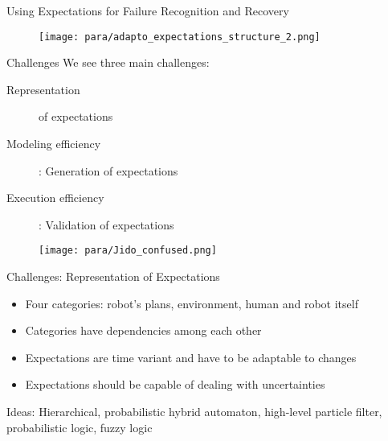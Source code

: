\documentclass{beamer}
\begin{document}
\begin{frame}{Using Expectations for Failure Recognition and Recovery}
 \begin{figure}[h]
    \texttt{[image: para/adapto\_expectations\_structure\_2.png]} 
  \end{figure}
\end{frame}

\begin{frame}{Challenges}
We see three main challenges:
 \begin{description}
\item [Representation] of expectations
\item [Modeling efficiency]: Generation of expectations
\item [Execution efficiency]: Validation of expectations
\end{description} 
 \begin{figure}[h]
        \texttt{[image: para/Jido\_confused.png]} \\
  \end{figure}
\end{frame}

\label{sec:representation}

\begin{frame}{Challenges: Representation of Expectations}
  \begin{itemize}
  \item Four categories: robot's plans, environment, human and robot itself
  \item Categories have dependencies among each other
  \item Expectations are time variant and have to be adaptable to changes
  \item Expectations should be capable of dealing with uncertainties
  \end{itemize}
  \begin{block}{Ideas:}
    Hierarchical, probabilistic hybrid automaton, high-level particle filter, probabilistic logic, fuzzy logic
  \end{block}
\end{frame}
\end{document}
